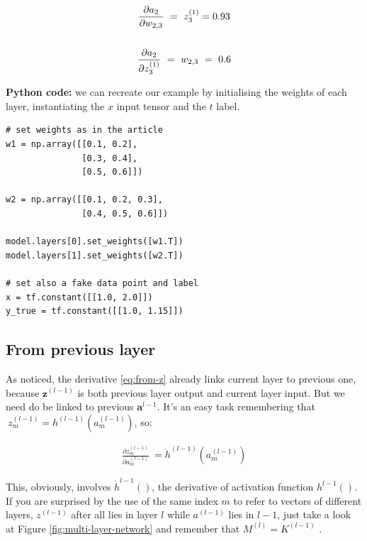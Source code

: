\documentclass{article}
\begin{document}
\begin{gather}
\frac{\partial a_{2}}{\partial w_{2,3}} \ =\ z_{3}^{( 1)} =0.93 \notag  \\
\notag\\
\frac{\partial a_{2}}{\partial z_{3}^{( 1)}} \ =\ w_{2,3} \ =\ 0.6 \notag 
\end{gather}

\begin{center}\textleaf\end{center}

\textbf{Python code:} we can recreate our example by initialising the weights of each layer, instantiating the $x$ input tensor and the $t$ label.

\begin{tcolorbox}[colback=gray!10, colframe=gray!50, title=Parameters initialization]
\begin{verbatim}
# set weights as in the article
w1 = np.array([[0.1, 0.2],
               [0.3, 0.4],
               [0.5, 0.6]])

w2 = np.array([[0.1, 0.2, 0.3],
               [0.4, 0.5, 0.6]])

model.layers[0].set_weights([w1.T])
model.layers[1].set_weights([w2.T])

# set also a fake data point and label
x = tf.constant([[1.0, 2.0]])
y_true = tf.constant([[1.0, 1.15]])
\end{verbatim}
\end{tcolorbox}


\subsection{From previous layer}\label{sec:from-previous}
As noticed, the derivative  \eqref{eq:from-z} already links current layer to previous one, because $\displaystyle \mathbf{z}^{( l-1)}$ is both previous layer output and current layer input. But we need do be linked to previous $\boldsymbol{a}^{l-1}$. It's an easy task remembering that$\displaystyle \ z_{m}^{( l-1)} =h^{( l-1)}( a_{m}^{( l-1)})$, so:


\begin{gather}
\frac{\partial z_{m}^{( l-1)}}{\partial a_{m}^{( l-1)}} \ =\dot{h}^{( l-1)} (a_{m}^{(l-1)})\label{eq:prev} 
\end{gather}

This, obviously, involves $\dot{h}^{l-1}()$, the derivative of activation function $h^{l-1}()$.  If you are surprised by the use of the same index $m$ to refer to vectors of different layers, $z^{(l-1)}$ after all lies in layer $l$ while $a^{(l-1)}$ lies in $l-1$, just take a look at Figure \ref{fig:multi-layer-network} and remember that $M^{(l)}=K^{(l-1)}$ .  \\   
\end{document}
